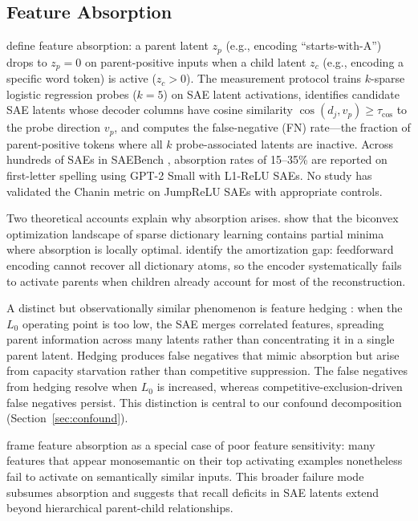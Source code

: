 \documentclass{article}
\begin{document}
\subsection{Feature Absorption}

\citet{chanin2024absorption} define feature absorption: a parent latent $z_p$ (e.g., encoding ``starts-with-A'') drops to $z_p = 0$ on parent-positive inputs when a child latent $z_c$ (e.g., encoding a specific word token) is active ($z_c > 0$). The measurement protocol trains $k$-sparse logistic regression probes ($k = 5$) on SAE latent activations, identifies candidate SAE latents whose decoder columns have cosine similarity $\cos(d_j, v_p) \geq \tau_{\cos}$ to the probe direction $v_p$, and computes the false-negative (FN) rate---the fraction of parent-positive tokens where all $k$ probe-associated latents are inactive. Across hundreds of SAEs in SAEBench \citep{karvonen2025saebench}, absorption rates of 15--35\% are reported on first-letter spelling using GPT-2 Small with L1-ReLU SAEs. No study has validated the Chanin metric on JumpReLU SAEs with appropriate controls.

Two theoretical accounts explain why absorption arises. \citet{tang2025theoretical} show that the biconvex optimization landscape of sparse dictionary learning contains partial minima where absorption is locally optimal. \citet{oneill2024amortization} identify the amortization gap: feedforward encoding cannot recover all dictionary atoms, so the encoder systematically fails to activate parents when children already account for most of the reconstruction.

A distinct but observationally similar phenomenon is feature hedging \citep{chanin2025hedging}: when the $L_0$ operating point is too low, the SAE merges correlated features, spreading parent information across many latents rather than concentrating it in a single parent latent. Hedging produces false negatives that mimic absorption but arise from capacity starvation rather than competitive suppression. The false negatives from hedging resolve when $L_0$ is increased, whereas competitive-exclusion-driven false negatives persist. This distinction is central to our confound decomposition (Section~\ref{sec:confound}).

\citet{tian2025sensitivity} frame feature absorption as a special case of poor feature sensitivity: many features that appear monosemantic on their top activating examples nonetheless fail to activate on semantically similar inputs. This broader failure mode subsumes absorption and suggests that recall deficits in SAE latents extend beyond hierarchical parent-child relationships.
\end{document}
